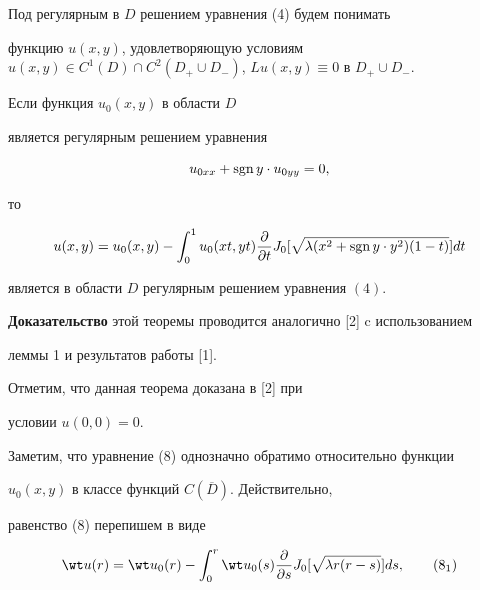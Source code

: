 Под регулярным в $D$ решением уравнения (4) будем понимать


функцию $u(x,y)$, удовлетворяющую условиям $u(x,y)\in C^1(D)\cap


C^2(D_+\cup D_-)$, $Lu(x,y)\equiv 0$ в $D_+\cup D_-$.





\begin{thm}


Если функция $u_0(x,y)$ в области $D$


является регулярным решением уравнения


\begin{equation}


u_{0xx}+\sgn y\cdot u_{0yy}=0,


\end{equation}


то


\begin{equation}


u(x,y)=u_0(x,y)-\int_0^1 u_0(xt,yt)\frac {\partial }


{\partial t}J_0[\sqrt {\lambda (x^2+\sgn y\cdot y^2)(1-t)}]dt


\end{equation}


является в области $D$ регулярным решением уравнения $(4)$.


\end{thm}





{\bf Доказательство} этой теоремы проводится аналогично [2] c использованием


леммы 1 и результатов работы [1].


Отметим, что данная теорема доказана в [2] при


условии $u(0,0)=0$.





Заметим, что уравнение (8) однозначно обратимо относительно функции


$u_0(x,y)$ в классе функций $C(\overline D)$. Действительно,


равенство (8) перепишем в виде


\begin{equation}


\wt u(r)=\wt u_0(r)-\int_0^r\wt u_0(s) \frac {\partial }{\partial s}


J_0[\sqrt {\lambda r(r-s)}]ds, \tag{8$_1$}


\end{equation}


